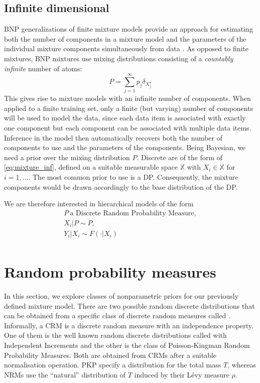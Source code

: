 \subsection{Infinite dimensional}
\acrlong{BNP} generalizations of finite mixture models provide an approach for estimating both the number of components in a mixture model and the parameters of the individual mixture components simultaneously from data \cite{ESCOBAR}. As opposed to finite mixtures, \gls{BNP} mixtures use mixing distributions consisting of a \textit{countably infinite} number of atoms:
\begin{equation} \label{eq:mixture_inf}
P = \sum_{j=1}^\infty p_j \delta_{X_j^\star}
\end{equation}
This gives rise to mixture models with an infinite number of components. When applied to a finite training set, only a finite (but varying) number of components will be used to model the data, since each data item is associated with exactly one component but each component can be associated with multiple data items.
Inference in the model then automatically recovers both the number of components to use and the parameters of the components.
Being Bayesian, we need a prior over the mixing distribution $P$. %
Discrete  are of the form of \ref{eq:mixture_inf}, defined on a suitable measurable space $\mathbb{X}$ with $X_i \in \mathbb{X}$ for $i=1,\dots$.
The most common prior to use is a \gls{DP}.
Consequently, the mixture components would be drawn accordingly to the base distribution of the \gls{DP}.


We are therefore interested in hierarchical models of the form
\begin{gather*}
P \ \text{a Discrete Random Probability Measure}, \\
X_i|P \sim P, \\
Y_i|X_i \sim F(\cdot|X_i) \\
\end{gather*}


\section{Random probability measures}
In this section, we explore classes of nonparametric priors for our previously defined mixture model.
There are two possible random discrete distributions that can be obtained from a specific class of discrete random measures called . Informally, a \gls{CRM} is a discrete random measure with an independence property. One of them is the well known random discrete distributions called  with Independent Increments and the other is the class of Poisson-Kingman Random Probability Measures.
Both are obtained from \glspl{CRM} after a suitable normalisation operation.
\gls{PKP} specify a distribution for the total mass $T$, whereas \glspl{NRM} use the ``natural'' distribution of $T$ induced by their Lévy measure $\rho$.

